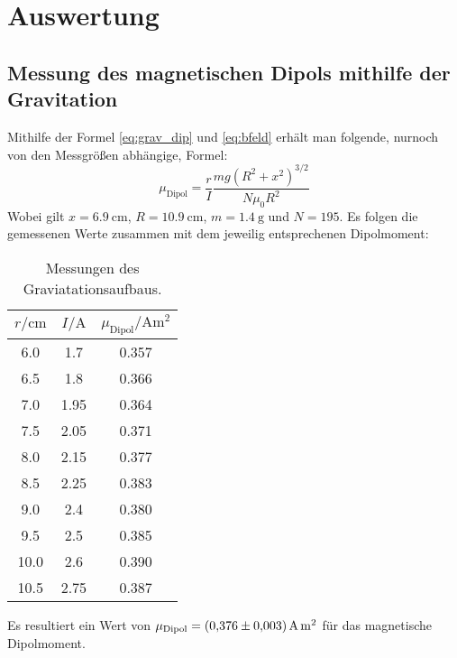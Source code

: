 \section{Auswertung}
\label{sec:Auswertung}
\subsection{Messung des magnetischen Dipols mithilfe der Gravitation}
Mithilfe der Formel \eqref{eq:grav_dip} und \eqref{eq:bfeld} erhält man folgende, nurnoch von den Messgrößen abhängige, Formel:
\begin{equation}
    \mu_\text{Dipol} = \frac{r}{I}\frac{mg\left(R^2+x^2\right)^{3/2}}{N\mu_0R^2}
\end{equation}
Wobei gilt $x=\SI{6.9}{\centi\meter}$, $R=\SI{10.9}{\centi\meter}$, $m=\SI{1.4}{\gram}$ und $N=\num{195}$.
Es folgen die gemessenen Werte zusammen mit dem jeweilig entsprechenen Dipolmoment:
%
\begin{table}[H]
\label{tab:gravtab}
    \centering
    \caption{Messungen des Graviatationsaufbaus.}
    \begin{tabular}{S[table-format=2.1(0)e0] S[table-format=1.2(0)e0] S[table-format=1.3(0)e0] }
        \toprule
        {$r/\si{\centi\meter}$} & {$I/\si{\ampere}$} & {$\mu_\text{Dipol}/\si{\ampere\meter\squared}$} \\
             & 1.7   & 0.357    \\
        6.5     & 1.8   & 0.366    \\
        7.0     & 1.95  & 0.364    \\
        7.5     & 2.05  & 0.371    \\
        8.0     & 2.15  & 0.377    \\
        8.5     & 2.25  & 0.383    \\
        9.0     & 2.4   & 0.380    \\
        9.5     & 2.5   & 0.385    \\
        10.0    & 2.6   & 0.390    \\
        10.5    & 2.75  & 0.387    \\
        \bottomrule
    \end{tabular}
\end{table}
\noindent
Es resultiert ein Wert von \mbox{$\mu_\text{Dipol} = \SI{0.376\pm0.003}{\ampere\meter\squared}$} für das magnetische Dipolmoment.
%

